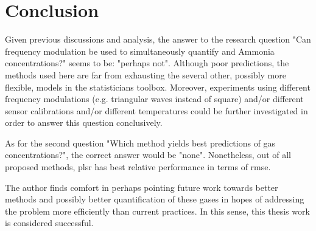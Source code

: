 
\chapter{Conclusion}
\label{cha:conclusion}

Given previous discussions and analysis, the answer to the research question "Can frequency modulation be used to simultaneously quantify \nox and Ammonia concentrations?" seems to be: "perhaps not". Although poor predictions, the methods used here are far from exhausting the several other, possibly more flexible, models in the statisticians toolbox. Moreover, experiments using different frequency modulations (e.g. triangular waves instead of square) and/or different sensor calibrations and/or different temperatures could be further investigated in order to answer this question conclusively.

As for the second question "Which method yields best predictions of gas concentrations?", the correct answer would be "none". Nonetheless, out of all proposed methods, \acrshort{plsr} has best relative performance in terms of \acrshort{rmse}.

The author finds comfort in perhaps pointing future work towards better methods and possibly better quantification of these gases in hopes of addressing the problem more efficiently than current practices. In this sense, this thesis work is considered successful.

